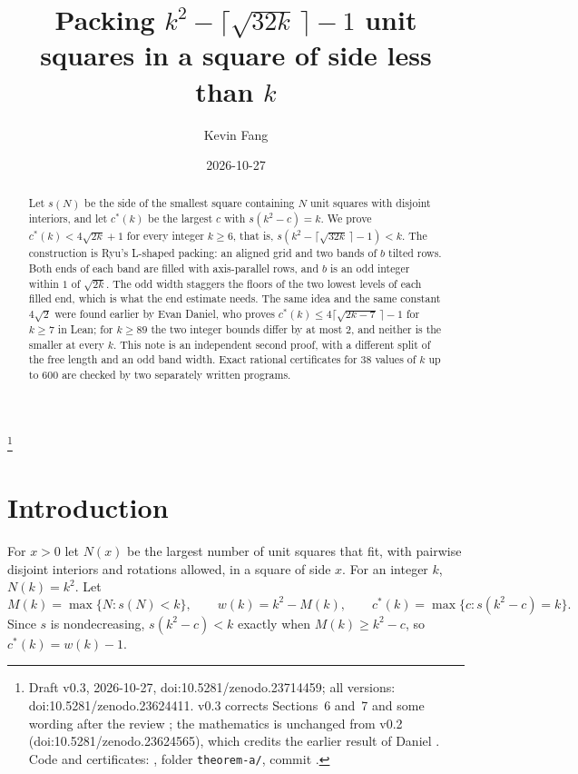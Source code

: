 \documentclass[11pt,letterpaper]{amsart}
\theoremstyle{plain}
\theoremstyle{remark}
\newcommand{\cs}{c^{*}}
\begin{document}
\title[Packing $k^2-\lceil\sqrt{32k}\,\rceil-1$ unit squares below side $k$]{Packing $k^2-\lceil\sqrt{32k}\,\rceil-1$ unit squares in a square of side less than $k$}
\author{Kevin Fang}
\date{2026-10-27}
\thanks{Draft v0.3, 2026-10-27, doi:10.5281/zenodo.23714459; all versions: doi:10.5281/zenodo.23624411. v0.3 corrects Sections~6 and~7 and some wording after the review \cite{Lev26}; the mathematics is unchanged from v0.2 (doi:10.5281/zenodo.23624565), which credits the earlier result of Daniel \cite{Dan26b}. Code and certificates: \cite{Fan26b}, folder \texttt{theorem-a/}, commit .}

\begin{abstract}
Let $s(N)$ be the side of the smallest square containing $N$ unit squares with disjoint interiors, and let $\cs(k)$ be the largest $c$ with $s(k^2-c)=k$. We prove $\cs(k)<4\sqrt{2k}+1$ for every integer $k\ge6$, that is, $s(k^2-\lceil\sqrt{32k}\,\rceil-1)<k$. The construction is Ryu's L-shaped packing: an aligned grid and two bands of $b$ tilted rows. Both ends of each band are filled with axis-parallel rows, and $b$ is an odd integer within $1$ of $\sqrt{2k}$. The odd width staggers the floors of the two lowest levels of each filled end, which is what the end estimate needs. The same idea and the same constant $4\sqrt2$ were found earlier by Evan Daniel, who proves $\cs(k)\le4\lceil\sqrt{2k-7}\,\rceil-1$ for $k\ge7$ in Lean; for $k\ge89$ the two integer bounds differ by at most $2$, and neither is the smaller at every $k$. This note is an independent second proof, with a different split of the free length and an odd band width. Exact rational certificates for $38$ values of $k$ up to $600$ are checked by two separately written programs.
\end{abstract}

\maketitle

\section{Introduction}

For $x>0$ let $N(x)$ be the largest number of unit squares that fit, with pairwise disjoint interiors and rotations allowed, in a square of side $x$. For an integer $k$, $N(k)=k^2$. Let
\[
M(k)=\max\{N : s(N)<k\},\qquad w(k)=k^2-M(k),\qquad \cs(k)=\max\{c : s(k^2-c)=k\}.
\]
Since $s$ is nondecreasing, $s(k^2-c)<k$ exactly when $M(k)\ge k^2-c$, so $\cs(k)=w(k)-1$.
\end{document}

